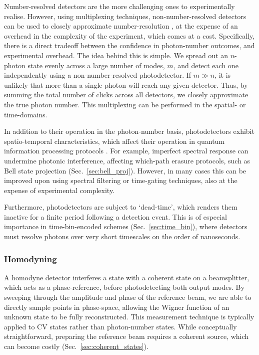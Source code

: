 \documentclass[aps,rmp,twocolumn,amsmath,amssymb,nofootinbib,superscriptaddress]{revtex4}
\begin{document}
Number-resolved detectors are the more challenging ones to experimentally realise. However, using multiplexing techniques, non-number-resolved detectors can be used to closely approximate number-resolution \cite{bib:Banaszek03, bib:RohdeCompDet07, ???}, at the expense of an overhead in the complexity of the experiment, which comes at a cost. Specifically, there is a direct tradeoff between the confidence in photon-number outcomes, and experimental overhead. The idea behind this is simple. We spread out an $n$-photon state evenly across a large number of modes, $m$, and detect each one independently using a non-number-resolved photodetector. If \mbox{$m\gg n$}, it is unlikely that more than a single photon will reach any given detector. Thus, by summing the total number of clicks across all detectors, we closely approximate the true photon number. This multiplexing can be performed in the spatial- or time-domains.

In addition to their operation in the photon-number basis, photodetectors exhibit spatio-temporal characteristics, which affect their operation in quantum information processing protocols \cite{RohdePDReview}. For example, imperfect spectral response can undermine photonic interference, affecting which-path erasure protocols, such as Bell state projection (Sec.~\ref{sec:bell_proj}). However, in many cases this can be improved upon using spectral filtering or time-gating techniques, also at the expense of experimental complexity.

Furthermore, photodetectors are subject to `dead-time', which renders them inactive for a finite period following a detection event. This is of especial importance in time-bin-encoded schemes (Sec.~\ref{sec:time_bin}), where detectors must resolve photons over very short timescales on the order of nanoseconds.

%
%

\subsubsection{Homodyning} \label{sec:homodyne}

A homodyne detector interferes a state with a coherent state on a beamsplitter, which acts as a phase-reference, before photodetecting both output modes. By sweeping through the amplitude and phase of the reference beam, we are able to directly sample points in phase-space, allowing the Wigner function of an unknown state to be fully reconstructed. This measurement technique is typically applied to CV states rather than photon-number states. While conceptually straightforward, preparing the reference beam requires a coherent source, which can become costly (Sec.~\ref{sec:coherent_states}).
\end{document}
